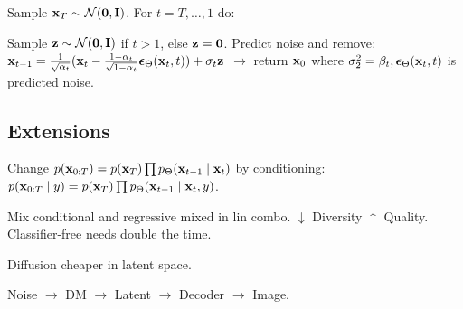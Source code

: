 \begin{definition}[Sampling]
    Sample \(\vb{x}_T \sim \operatorname{\mathcal{N}}(\vb{0}, \vb{I})\). For \(t = T, \ldots, 1\) do:
    
    Sample \(\vb{z} \sim \operatorname{\mathcal{N}}(\vb{0}, \vb{I})\) if \(t > 1\), else \(\vb{z} = \vb{0}\). Predict noise and remove: \(\vb{x}_{t-1} = \frac{1}{\sqrt{\alpha_t}}(\vb{x}_t - \frac{1 - \alpha_t}{\sqrt{1 - \alpha_t}}\vb*{\epsilon}_{\Theta}(\vb{x}_t, t)) + \sigma_t \vb{z}\) \(\to\) return \(\vb{x}_0\) where
    \(\sigma_2^2 = \beta_t, \vb*{\epsilon}_{\Theta}(\vb{x}_t, t)\) is predicted noise.
\end{definition}

\subsection{Extensions}
\begin{definition}[Conditional]
    Change \(p(\vb{x}_{0:T}) = p(\vb{x}_T)\prod p_{\Theta}(\vb{x}_{t-1} \mid \vb{x}_t)\) by conditioning: \(p(\vb{x}_{0:T} \mid y) = p(\vb{x}_T)\prod p_{\Theta}(\vb{x}_{t-1} \mid \vb{x}_t, y)\).
\end{definition}

\begin{definition}[Guidance]
    Mix conditional and regressive mixed in lin combo.
    \(\downarrow\) Diversity \(\uparrow\) Quality. Classifier-free needs double the time.
\end{definition}

\begin{definition}
    Diffusion cheaper in latent space.

    Noise \(\to\) DM \(\to\) Latent \(\to\) Decoder \(\to\) Image.
\end{definition}


